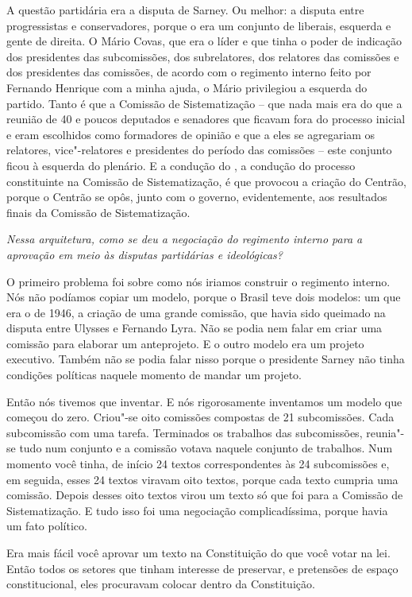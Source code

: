 A questão partidária era a disputa de Sarney. Ou melhor:
a disputa entre progressistas e conservadores, porque o  era um
conjunto de liberais, esquerda e gente de direita. O Mário Covas, que
era o líder e que tinha o poder de indicação dos presidentes das
subcomissões, dos subrelatores, dos relatores das comissões e dos
presidentes das comissões, de acordo com o regimento interno feito por
Fernando Henrique com a minha ajuda, o Mário privilegiou a esquerda do
partido. Tanto é que a Comissão de Sistematização -- que nada mais era
do que a reunião de 40 e poucos deputados e senadores que ficavam fora
do processo inicial e eram escolhidos como formadores de opinião e que a
eles se agregariam os relatores, vice"-relatores e presidentes do período
das comissões -- este conjunto ficou à esquerda do plenário. E a
condução do , a condução do processo constituinte na Comissão de
Sistematização, é que provocou a criação do Centrão, porque o Centrão se
opôs, junto com o governo, evidentemente, aos resultados finais da
Comissão de Sistematização.

\medskip

\noindent\emph{Nessa arquitetura, como se deu a negociação do regimento interno
para a aprovação em meio às disputas partidárias e ideológicas?}

O primeiro problema foi sobre como nós iriamos construir
o regimento interno. Nós não podíamos copiar um modelo, porque o Brasil
teve dois modelos: um que era o de 1946, a criação de uma grande
comissão, que havia sido queimado na disputa entre Ulysses e Fernando
Lyra. Não se podia nem falar em criar uma comissão para elaborar um
anteprojeto. E o outro modelo era um projeto executivo. Também não se
podia falar nisso porque o presidente Sarney não tinha condições
políticas naquele momento de mandar um projeto.

Então nós tivemos que inventar. E nós rigorosamente inventamos um modelo
que começou do zero. Criou"-se oito comissões compostas de 21
subcomissões. Cada subcomissão com uma tarefa. Terminados os trabalhos
das subcomissões, reunia"-se tudo num conjunto e a comissão votava
naquele conjunto de trabalhos. Num momento você tinha, de início 24
textos correspondentes às 24 subcomissões e, em seguida, esses 24 textos
viravam oito textos, porque cada texto cumpria uma comissão. Depois
desses oito textos virou um texto só que foi para a Comissão de
Sistematização. E tudo isso foi uma negociação complicadíssima, porque
havia um fato político.

Era mais fácil você aprovar um texto na Constituição do que você votar
na lei. Então todos os setores que tinham interesse de preservar, e
pretensões de espaço constitucional, eles procuravam colocar dentro da
Constituição.

